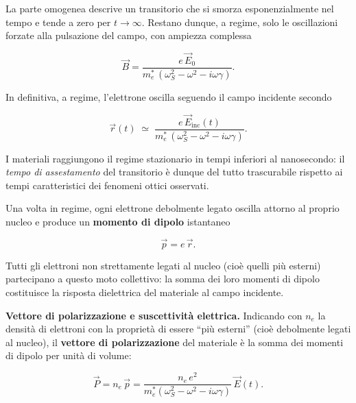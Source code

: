 La parte omogenea descrive un transitorio che si smorza esponenzialmente nel tempo e tende a zero per \( t \to \infty \). Restano dunque, a regime, solo le oscillazioni forzate alla pulsazione del campo, con ampiezza complessa

\begin{equation}
    \vec{B} = \frac{e \, \vec{E}_0}{m_e^{*} \, (\omega_S^{2} - \omega^{2} - i \omega \gamma)}.
\end{equation}

In definitiva, a regime, l'elettrone oscilla seguendo il campo incidente secondo

\begin{importantbox}
    \begin{equation}
        \vec{r}(t) \;\simeq\; \frac{e \, \vec{E}_{\text{inc}}(t)}{m_e^{*} \, (\omega_S^{2} - \omega^{2} - i \omega \gamma)}.
    \end{equation}
\end{importantbox}

\begin{remark}
I materiali raggiungono il regime stazionario in tempi inferiori al nanosecondo: il \emph{tempo di assestamento} del transitorio è dunque del tutto trascurabile rispetto ai tempi caratteristici dei fenomeni ottici osservati.
\end{remark}

Una volta in regime, ogni elettrone debolmente legato oscilla attorno al proprio nucleo e produce un \textbf{momento di dipolo} istantaneo

\begin{equation}
    \vec{p} = e \, \vec{r}.
\end{equation}

Tutti gli elettroni non strettamente legati al nucleo (cioè quelli più esterni) partecipano a questo moto collettivo: la somma dei loro momenti di dipolo costituisce la risposta dielettrica del materiale al campo incidente.

\textbf{Vettore di polarizzazione e suscettività elettrica.} Indicando con \( n_e \) la densità di elettroni con la proprietà di essere ``più esterni'' (cioè debolmente legati al nucleo), il \textbf{vettore di polarizzazione} del materiale è la somma dei momenti di dipolo per unità di volume:

\begin{equation}
    \vec{P} = n_e \, \vec{p} = \frac{n_e \, e^{2}}{m_e^{*} (\omega_S^{2} - \omega^{2} - i \omega \gamma)} \, \vec{E}(t).
\end{equation}

